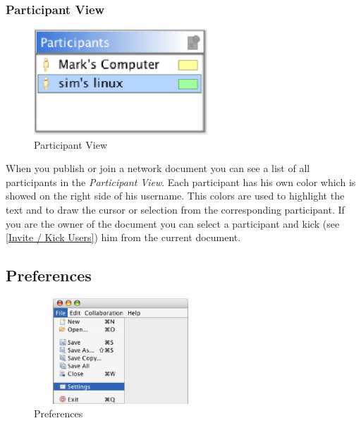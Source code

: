 \documentclass[11pt,a4paper]{article}
\begin{document}
\subsubsection{Participant View}

\begin{figure}[H]
\begin{center}
  \includegraphics[height=1.56in, width=2.56in]{../images/usermanual/pview_overview.bmp.eps}
\caption{Participant View}
\label{default}
\end{center}
\end{figure}

When you publish or join a network document you can see a list of all participants in the \textit{Participant View}. Each participant has his own color which is showed on the right side of his username. This colors are used to highlight the text and to draw the cursor or selection from the corresponding participant. If you are the owner of the document you can select a participant and kick (see \ref{Invite / Kick Users}) him from the current document.

\subsection{Preferences}
\begin{figure}[H]
\begin{center}
  \includegraphics[height=1.56in, width=2.56in]{../images/usermanual/nmenu_file_preferences.bmp.eps}
\caption{Preferences}
\label{default}
\end{center}
\end{figure}
\end{document}

